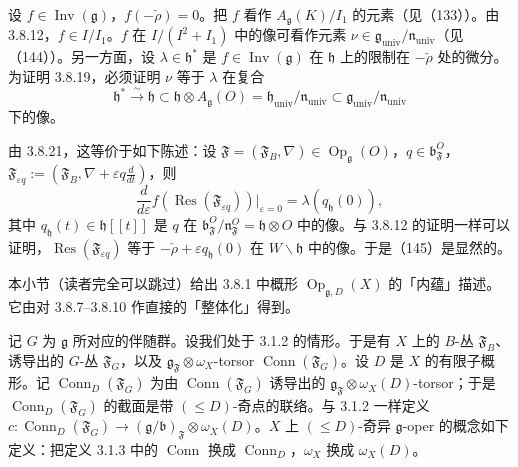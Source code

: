 设 $f\in\operatorname{Inv}(\mathfrak{g})$，$f(-\check\rho)=0$。把 $f$ 看作 $A_{\mathfrak{g}}(K)/I_{1}$ 的元素（见（133））。由 3.8.12，$f\in I/I_{1}$。$f$ 在 $I/(I^{2}+I_{1})$ 中的像可看作元素 $\nu\in\mathfrak{g}_{\mathrm{univ}}/\mathfrak{n}_{\mathrm{univ}}$（见（144））。另一方面，设 $\lambda\in\mathfrak{h}^{*}$ 是 $f\in\operatorname{Inv}(\mathfrak{g})$ 在 $\mathfrak{h}$ 上的限制在 $-\check\rho$ 处的微分。为证明 3.8.19，必须证明 $\nu$ 等于 $\lambda$ 在复合
\[
\mathfrak{h}^{*}\xrightarrow{\sim}\mathfrak{h}\subset\mathfrak{h}\otimes A_{\mathfrak{g}}(O)
  =\mathfrak{h}_{\mathrm{univ}}/\mathfrak{n}_{\mathrm{univ}}\subset\mathfrak{g}_{\mathrm{univ}}/\mathfrak{n}_{\mathrm{univ}}
\]
下的像。

由 3.8.21，这等价于如下陈述：设 $\mathfrak{F}=(\mathfrak{F}_{B},\nabla)\in\operatorname{Op}_{\mathfrak{g}}(O)$，$q\in\mathfrak{b}^{O}_{\mathfrak{F}}$，$\mathfrak{F}_{\varepsilon q}:=(\mathfrak{F}_{B},\nabla+\varepsilon q\frac{d}{dt})$，则
\begin{equation}\tag{145}
  \frac{d}{d\varepsilon}f(\operatorname{Res}(\mathfrak{F}_{\varepsilon q}))|_{\varepsilon=0}=\lambda(q_{\mathfrak{h}}(0)),
\end{equation}
其中 $q_{\mathfrak{h}}(t)\in\mathfrak{h}[[t]]$ 是 $q$ 在 $\mathfrak{b}^{O}_{\mathfrak{F}}/\mathfrak{n}^{O}_{\mathfrak{F}}=\mathfrak{h}\otimes O$ 中的像。与 3.8.12 的证明一样可以证明，$\operatorname{Res}(\mathfrak{F}_{\varepsilon q})$ 等于 $-\check\rho+\varepsilon q_{\mathfrak{h}}(0)$ 在 $W\backslash\mathfrak{h}$ 中的像。于是（145）是显然的。


 本小节（读者完全可以跳过）给出 3.8.1 中概形 $\operatorname{Op}_{\mathfrak{g},D}(X)$ 的「内蕴」描述。它由对 3.8.7--3.8.10 作直接的「整体化」得到。

记 $G$ 为 $\mathfrak{g}$ 所对应的伴随群。设我们处于 3.1.2 的情形。于是有 $X$ 上的 $B$-丛 $\mathfrak{F}_{B}$、诱导出的 $G$-丛 $\mathfrak{F}_{G}$，以及 $\mathfrak{g}_{\mathfrak{F}}\otimes\omega_{X}$-torsor $\operatorname{Conn}(\mathfrak{F}_{G})$。设 $D$ 是 $X$ 的有限子概形。记 $\operatorname{Conn}_{D}(\mathfrak{F}_{G})$ 为由 $\operatorname{Conn}(\mathfrak{F}_{G})$ 诱导出的 $\mathfrak{g}_{\mathfrak{F}}\otimes\omega_{X}(D)$-torsor；于是 $\operatorname{Conn}_{D}(\mathfrak{F}_{G})$ 的截面是带 $(\le D)$-奇点的联络。与 3.1.2 一样定义 $c:\operatorname{Conn}_{D}(\mathfrak{F}_{G})\to(\mathfrak{g}/\mathfrak{b})_{\mathfrak{F}}\otimes\omega_{X}(D)$。$X$ 上 $(\le D)$-奇异 $\mathfrak{g}$-oper 的概念如下定义：把定义 3.1.3 中的 $\operatorname{Conn}$ 换成 $\operatorname{Conn}_{D}$，$\omega_{X}$ 换成 $\omega_{X}(D)$。

